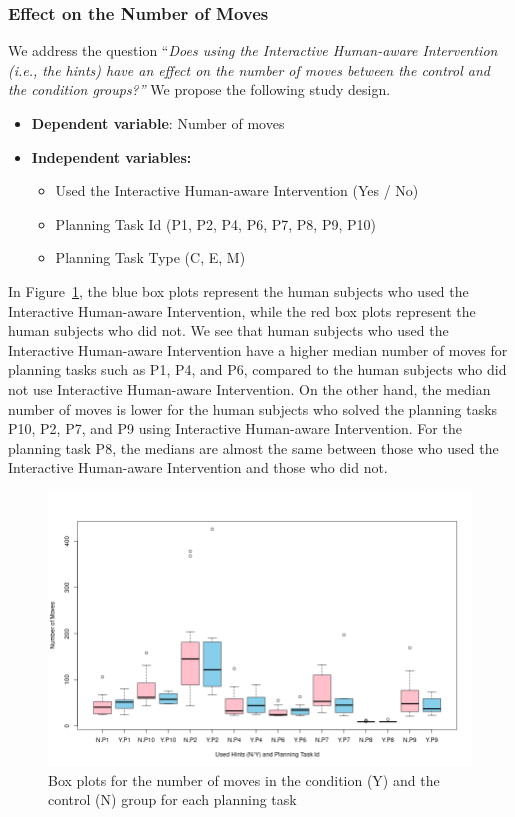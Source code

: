 \subsubsection{Effect on the Number of Moves}
We address the question ``\textit{Does using the Interactive Human-aware Intervention (i.e., the hints) have an effect on the number of moves between the control and the condition groups?''}
We propose the following study design.
\begin{itemize}
\item \textbf{Dependent variable}: Number of  moves
\item \textbf{Independent variables:}
\begin{itemize}
\item Used the Interactive Human-aware Intervention (Yes / No)
\item Planning Task Id (P1, P2, P4, P6, P7, P8, P9, P10)
\item Planning Task Type (C, E, M)
\end{itemize}
\end{itemize}

\noindent In Figure~\ref{fig:lenbypid}, the blue box plots represent the human subjects who used the Interactive Human-aware Intervention, while the red box plots represent the human subjects who did not.
We see that human subjects who used the Interactive Human-aware Intervention have a higher median number of moves for planning tasks such as P1, P4, and P6, compared to the human subjects who did not use Interactive Human-aware Intervention.
On the other hand, the median number of moves is lower for the human subjects who solved the planning tasks P10, P2, P7, and P9 using Interactive Human-aware Intervention.
For the planning task P8, the medians are almost the same between those who used the Interactive Human-aware Intervention and those who did not.
\begin{figure}[tpb]
  \centering
\includegraphics[width=\columnwidth]{img/lenbypid.png}
  \caption{Box plots for the number of moves in the condition (Y) and the control (N) group for each planning task}
  \label{fig:lenbypid}
\end{figure}


